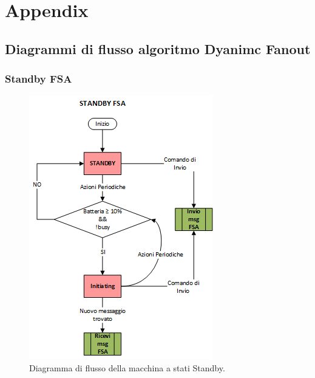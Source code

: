 \chapter{Appendix}

\section{Diagrammi di flusso algoritmo Dyanimc Fanout}
\subsection{Standby FSA}
\label{apx:stb_fsa}
\begin{figure}[h]
	\centering
	\includegraphics[]{Images/diagrammi_fsa/Standby_fsa}
	\caption[Standby fsa]{Diagramma di flusso della macchina a stati Standby.}
	\label{fig:Standby_fsa}
\end{figure}
\newpage

